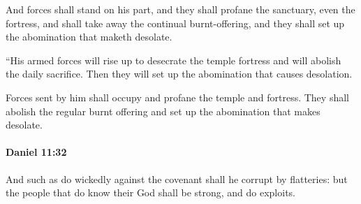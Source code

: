 			\begin{versebox}
					\item[BHS] 
					\item[LXX] 
					\item[ASV] And forces shall stand on his part, and they shall profane the sanctuary, even the fortress, and shall take away the continual burnt-offering, and they shall set up the abomination that maketh desolate.
					\item[NIV] “His armed forces will rise up to desecrate the temple fortress and will abolish the daily sacrifice. Then they will set up the abomination that causes desolation.
					\item[NRSV] Forces sent by him shall occupy and profane the temple and fortress. They shall abolish the regular burnt offering and set up the abomination that makes desolate.
			\end{versebox}

		\paragraph{Daniel 11:32} %
			\label{DANIEL-11-32}

			And such as do wickedly against the covenant shall he corrupt by flatteries: but the people that do know their God shall be strong, and do exploits.

